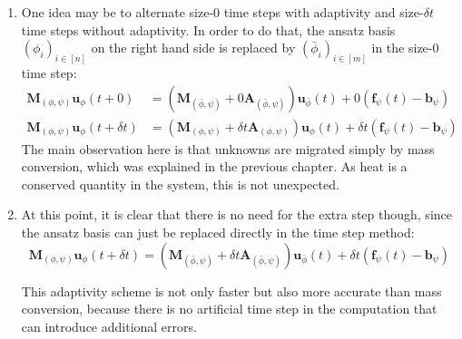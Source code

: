 \documentclass{IOS-Book-Article}
\theoremstyle{plain}
\theoremstyle{definition}
\begin{document}
\begin{enumerate}
\item One idea may be to alternate size-$0$ time steps with adaptivity and size-$\delta t$ time steps without adaptivity. In order to do that, the ansatz basis $(\phi_i)_{i \in [n]}$ on the right hand side is replaced by $(\bar \phi_i)_{i \in [m]}$ in the size-$0$ time step:
\begin{align*}
 \mathbf M_{(\phi, \psi)} \mathbf u_\phi(t + 0) &= (\mathbf M_{(\bar \phi, \psi)} + 0 \mathbf A_{(\bar \phi, \psi)}) \mathbf u_{\bar \phi}(t) + 0 (\mathbf f_\psi(t) - \mathbf b_\psi)\\
 \mathbf M_{(\phi, \psi)} \mathbf u_\phi(t + \delta t) &= (\mathbf M_{(\phi, \psi)} + \delta t \mathbf A_{(\phi, \psi)}) \mathbf u_{\phi}(t) + \delta t (\mathbf f_\psi(t) - \mathbf b_\psi)
\end{align*}
The main observation here is that unknowns are migrated simply by mass conversion, which was explained in the previous chapter. As heat is a conserved quantity in the system, this is not unexpected.
\item At this point, it is clear that there is no need for the extra step though, since the ansatz basis can just be replaced directly in the time step method:
\begin{equation*}
 \mathbf M_{(\phi, \psi)} \mathbf u_\phi(t + \delta t) = (\mathbf M_{(\bar \phi, \psi)} + \delta t \mathbf A_{(\bar \phi, \psi)}) \mathbf u_{\bar \phi}(t) + \delta t (\mathbf f_\psi(t) - \mathbf b_\psi)
\end{equation*}

This adaptivity scheme is not only faster but also more accurate than mass conversion, because there is no artificial time step in the computation that can introduce additional errors.\\

\end{enumerate}
\end{document}
